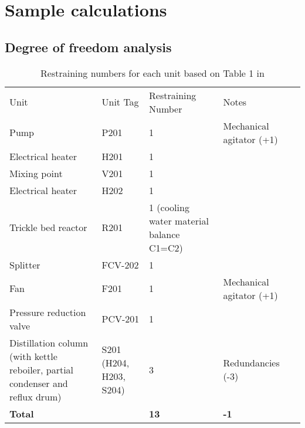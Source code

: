 \section{Sample calculations}
\label{app:samplecal}

\subsection{Degree of freedom analysis}

\begin{table}[]
\label{tab:dof-restraining-no.}
\caption{Restraining numbers for each unit based on Table 1 in \textcite{}}
\begin{tabular}{lllll}
\cline{1-4}
Unit                                                                          & Unit Tag                  & Restraining Number                       & Notes                    &  \\ \cline{1-4}
Pump                                                                          & P201                      & 1                                        & Mechanical agitator (+1) &  \\
Electrical heater                                                             & H201                      & 1                                        &                          &  \\
Mixing point                                                                  & V201                      & 1                                        &                          &  \\
Electrical heater                                                             & H202                      & 1                                        &                          &  \\
Trickle bed reactor                                                           & R201                      & 1 (cooling water material balance C1=C2) &                          &  \\
Splitter                                                                      & FCV-202                   & 1                                        &                          &  \\
Fan                                                                           & F201                      & 1                                        & Mechanical agitator (+1) &  \\
Pressure reduction valve                                                      & PCV-201                   & 1                                        &                          &  \\
Distillation column (with kettle reboiler, partial condenser and reflux drum) & S201 (H204,   H203, S204) & 3                                        & Redundancies (-3)        &  \\
\textbf{Total}                                                                & \textbf{}                 & \textbf{13}                              & \textbf{-1}              &  \\ \cline{1-4}
\end{tabular}
\end{table}

